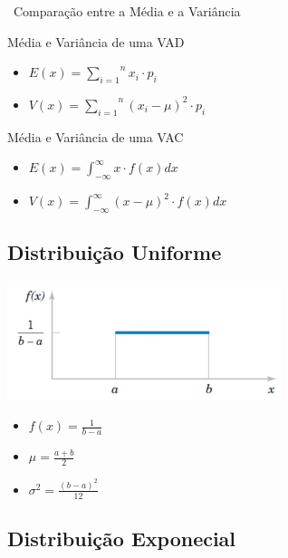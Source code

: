\documentclass{article}
\begin{document}
  \ Comparação entre a Média e a Variância

  \begin{multicols}{2}
    
    Média e Variância de uma VAD
    \begin{itemize}
      \item $ E(x) = \overset{n}{\underset{i=1}{\sum}} x_i \cdot p_i $
      \item $ V(x) = \overset{n}{\underset{i=1}{\sum}} (x_i - \mu )^2 \cdot p_i $
    \end{itemize}
    
    Média e Variância de uma VAC
    \begin{itemize}
      \item $ E(x) =  \int^{\infty}_{-\infty} x \cdot f(x)dx$
      \item $ V(x) =  \int^{\infty}_{-\infty} (x-\mu)^2 \cdot f(x)dx$
    \end{itemize}
  
  \end{multicols}

  \subsection{Distribuição Uniforme}

  \begin{multicols}{2}

    \hbox{\includegraphics[width=8cm]{distribuição continua.jpg}}  
    \begin{itemize}
      \item $ f(x) = \frac{1}{b-a}$
      \item $ \mu = \frac{a+b}{2} $
      \item $ \sigma^2 = \frac{(b-a)^2}{12}$
    \end{itemize}

  \end{multicols}
  
  \subsection{Distribuição Exponecial}
\end{document}
